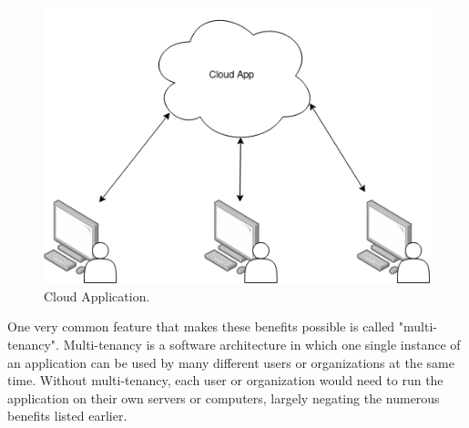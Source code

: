 \begin{figure}[H]
    \centering
    \includegraphics[scale=0.35]{images/basic-cloud-services.drawio.png}
    \caption{Cloud Application.}
    \label{fig:cloud-applications}
\end{figure}



One very common feature that makes these benefits possible is called "multi-tenancy".
Multi-tenancy is a software architecture in which one single instance of an application
can be used by many different users or organizations at the same time. 
Without multi-tenancy, each user or organization would need to run the application on
their own servers or computers, 
largely negating the numerous benefits listed earlier.



